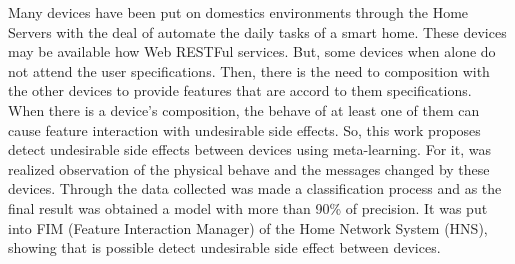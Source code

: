 Many devices have been put on domestics environments through the Home Servers with the deal of automate the daily tasks of a smart home. These devices may be available how Web RESTFul services. But, some devices when alone do not attend the user specifications. Then, there is the need to composition with the other devices to provide features that are accord to them specifications. When there is a device's composition, the behave of at least one of them can cause feature interaction with undesirable side effects. So, this work proposes detect undesirable side effects between devices using meta-learning. For it, was realized observation of the physical behave and the messages changed by these devices. Through the data collected was made a classification process and as the final result was obtained a model with more than 90\% of precision. It was put into FIM (Feature Interaction Manager) of the Home Network System (HNS), showing that is possible detect undesirable side effect between devices.
